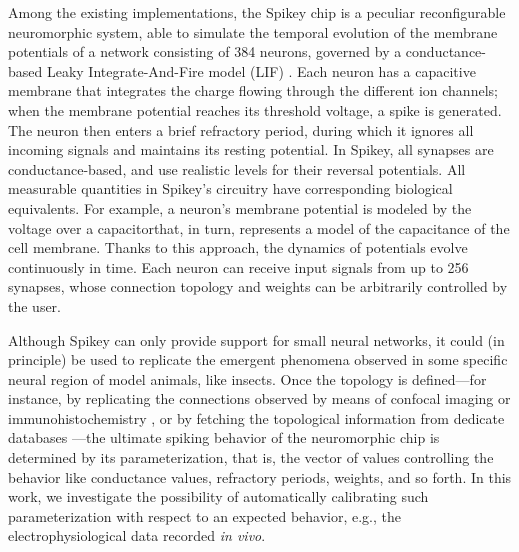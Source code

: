 \documentclass[utf8]{frontiersFPHY} %
\begin{document}
Among the existing implementations, the Spikey chip \cite{Pfeil2013} is a peculiar reconfigurable neuromorphic system, able to simulate the temporal evolution of the membrane potentials of a network consisting of 384 neurons, governed by a conductance-based Leaky Integrate-And-Fire model (LIF) \cite{}.
Each neuron has a capacitive membrane that integrates the charge flowing through the different ion channels; when the membrane potential reaches its threshold voltage, a spike is generated.  
The neuron then enters a brief refractory period, during which it ignores all incoming signals and maintains its resting potential.
In Spikey, all synapses are conductance-based, and use realistic levels for their reversal potentials. 
All measurable quantities in Spikey's circuitry have corresponding biological equivalents. 
For example, a neuron's membrane potential is modeled by the voltage over a capacitorthat, in turn, represents a model of the capacitance of the cell membrane.
Thanks to this approach, the dynamics of potentials evolve continuously in time. 
Each neuron can receive input signals from up to 256 synapses, whose connection topology and weights can be arbitrarily controlled by the user.

Although Spikey can only provide support for small neural networks, it could (in principle) be used to replicate the emergent phenomena observed in some specific neural region of model animals, like insects. 
Once the topology is defined---for instance, by replicating the connections observed by means of confocal imaging \cite{mishima1999physiological} or immunohistochemistry \cite{nishikawa2008neural}, or by fetching the topological information from dedicate databases \cite{kazawa2008development}---the ultimate spiking behavior of the neuromorphic chip is determined by its parameterization, that is, the vector of values controlling the behavior like conductance values, refractory periods, weights, and so forth. 
In this work, we investigate the possibility of automatically calibrating such parameterization with respect to an expected behavior, e.g., the electrophysiological data recorded \emph{in vivo}.
\end{document}
